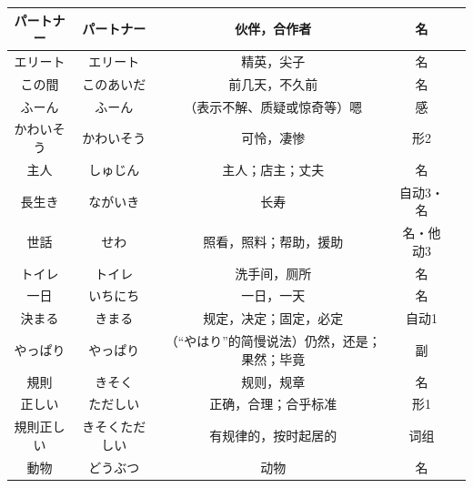 \begin{longtable}{|c|c|c|c|c|}
    パートナー & パートナー & 伙伴，合作者 & 名 & \\ \hline
    エリート & エリート & 精英，尖子 & 名 & \\ \hline
    この間 & このあいだ & 前几天，不久前 & 名 & \\ \hline
    ふーん & ふーん & （表示不解、质疑或惊奇等）嗯 & 感 & \\ \hline
    かわいそう & かわいそう & 可怜，凄惨 & 形2 & \\ \hline
    主人 & しゅじん & 主人；店主；丈夫 & 名 & \\ \hline
    長生き & ながいき & 长寿 & 自动3・名 & \\ \hline
    世話 & せわ & 照看，照料；帮助，援助 & 名・他动3 & \\ \hline
    トイレ & トイレ & 洗手间，厕所 & 名 & \\ \hline
    一日 & いちにち & 一日，一天 & 名 & \\ \hline
    決まる & きまる & 规定，决定；固定，必定 & 自动1 & \\ \hline
    やっぱり & やっぱり & （“やはり”的简慢说法）仍然，还是；果然；毕竟 & 副 & \\ \hline
    規則 & きそく & 规则，规章 & 名 & \\ \hline
    正しい & ただしい & 正确，合理；合乎标准 & 形1 & \\ \hline
    規則正しい & きそくただしい & 有规律的，按时起居的 & 词组 & \\ \hline
    動物 & どうぶつ & 动物 & 名 & \\ \hline
\end{longtable}


